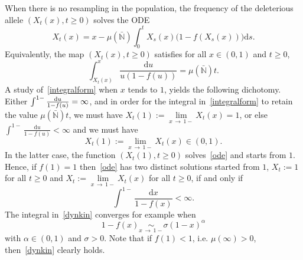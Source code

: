 \documentclass[AHL,Unicode,longabstracts,published]{cedram}
\newcommand{\ddr}{\mathrm{d}}
\newcommand{\bbN}{\mathbb{N}}
\begin{document}
When there is no resampling in the population, the frequency of the deleterious allele $(X_t(x),t\geq 0)$ solves the ODE
\begin{equation}\label{ode}
X_{t}(x)=x-\mu(\bar{\bbN})\int_{0}^{t}X_s(x)\big(1-f(X_s(x))\big)\ddr s.
\end{equation}
Equivalently, the map $(X_t(x),t\geq 0)$ satisfies for all $x\in (0,1)$ and $t\geq 0$,
\begin{equation}\label{integralform}
\int_{X_t(x)}^{x}\frac{\ddr u}{u(1-f(u))}=\mu(\bar{\bbN})t.
\end{equation}
A study of~\eqref{integralform} when $x$ tends to $1$, yields the following dichotomy. Either $\int^{1-}\frac{\ddr u}{1-f(u)}\linebreak=\infty$, and in order for the integral in~\eqref{integralform} to retain the value $\mu(\bar{\bbN})t$, we must have $X_t(1):=\underset{x\,\rightarrow\,1-}{\lim}X_t(x)=1$, or else $\int^{1-}\frac{\ddr u}{1-f(u)}<\infty$ and we must have
\[
X_t(1):=\underset{x\,\rightarrow\,1-}{\lim}X_t(x)\in (0,1).
\]
In the latter case, the function $(X_t(1),t\geq 0)$ solves~\eqref{ode} and starts from $1$. Hence, if $f(1)=1$ then~\eqref{ode} has two distinct solutions started from $1$, $X_t:=1$ for all $t\geq 0$ and $X_t:=\underset{x\,\rightarrow\,1-}{\lim} X_t(x)$ for all $t\geq 0$, if and only if
\begin{equation}\label{dynkin}
\int^{1-} \frac{\ddr x}{1-f(x)}<\infty.
\end{equation}
The integral in~\eqref{dynkin} converges for example when
\[
1-f(x)\underset{x\,\rightarrow\,1-}{\sim} \sigma (1-x)^{\alpha}
\]
with $\alpha\in (0,1)$ and $\sigma>0$. Note that if $f(1)<1$, i.e. $\mu(\infty)>0$, then~\eqref{dynkin} clearly holds.
\end{document}
